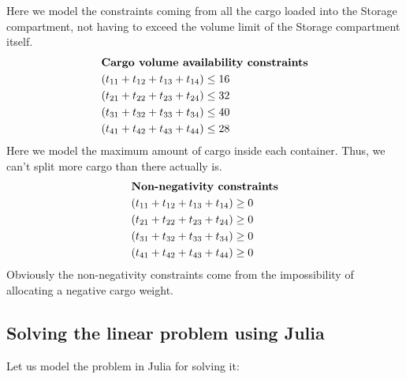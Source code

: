 \documentclass[unicode,11pt,a4paper,oneside,numbers=endperiod,openany]{scrartcl}
\begin{document}
Here we model the constraints coming from all the cargo loaded into the Storage compartment, not having to exceed the volume limit of the Storage compartment itself.
\begin{align*}
  & \text{\textbf{Cargo volume availability constraints}} \\
  & (t_{11}+t_{12}+t_{13}+t_{14}) \leq 16\\
  & (t_{21}+t_{22}+t_{23}+t_{24}) \leq 32\\
  & (t_{31}+t_{32}+t_{33}+t_{34}) \leq 40\\
  & (t_{41}+t_{42}+t_{43}+t_{44}) \leq 28\\
\end{align*}
Here we model the maximum amount of cargo inside each container. Thus, we can't split more cargo than there actually is.
\begin{align*}
  & \text{\textbf{Non-negativity constraints}} \\
  & (t_{11}+t_{12}+t_{13}+t_{14}) \geq 0\\
  & (t_{21}+t_{22}+t_{23}+t_{24}) \geq 0\\
  & (t_{31}+t_{32}+t_{33}+t_{34}) \geq 0\\
  & (t_{41}+t_{42}+t_{43}+t_{44}) \geq 0\\
\end{align*}
Obviously the non-negativity constraints come from the impossibility of allocating a negative cargo weight.

\subsection{Solving the linear problem using Julia}
Let us model the problem in Julia for solving it:\\


\end{document}
